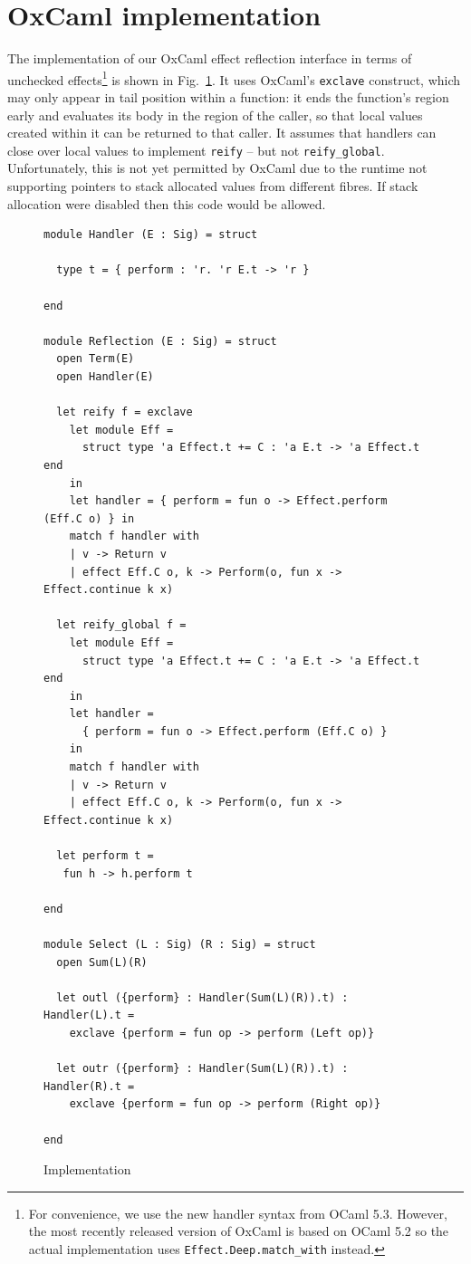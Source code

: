 \documentclass[acmsmall, screen, review, anonymous]{acmart}
\theoremstyle{definition}
\begin{document}
\section{OxCaml implementation}
\label{apdx:implementation}
The implementation of our OxCaml effect reflection interface in terms of
unchecked effects\footnote{For convenience, we use the new handler
  syntax from OCaml 5.3. However, the most recently released version of
  OxCaml is based on OCaml 5.2 so the actual implementation uses
  \lstinline[style=oxcaml]{Effect.Deep.match_with} instead.} is shown in
Fig.~\ref{fig:implementation}. It uses OxCaml's
\lstinline[style=oxcaml]{exclave} construct, which may only appear in
tail position within a function: it ends the function's region early
and evaluates its body in the region of the caller, so that local values
created within it can be returned to that caller. It assumes that
handlers can close over local values to implement
\lstinline[style=oxcaml]{reify} -- but not
\lstinline[style=oxcaml]{reify_global}. Unfortunately, this is not yet
permitted by OxCaml due to the runtime not supporting pointers to stack
allocated values from different fibres. If stack allocation were
disabled then this code would be allowed.
\begin{figure}
\begin{lstlisting}[style=oxcaml]
module Handler (E : Sig) = struct

  type t = { perform : 'r. 'r E.t -> 'r }

end

module Reflection (E : Sig) = struct
  open Term(E)
  open Handler(E)

  let reify f = exclave
    let module Eff =
      struct type 'a Effect.t += C : 'a E.t -> 'a Effect.t end
    in
    let handler = { perform = fun o -> Effect.perform (Eff.C o) } in
    match f handler with
    | v -> Return v
    | effect Eff.C o, k -> Perform(o, fun x -> Effect.continue k x)

  let reify_global f =
    let module Eff =
      struct type 'a Effect.t += C : 'a E.t -> 'a Effect.t end
    in
    let handler =
      { perform = fun o -> Effect.perform (Eff.C o) }
    in
    match f handler with
    | v -> Return v
    | effect Eff.C o, k -> Perform(o, fun x -> Effect.continue k x)

  let perform t =
   fun h -> h.perform t

end

module Select (L : Sig) (R : Sig) = struct
  open Sum(L)(R)

  let outl ({perform} : Handler(Sum(L)(R)).t) : Handler(L).t =
    exclave {perform = fun op -> perform (Left op)}

  let outr ({perform} : Handler(Sum(L)(R)).t) : Handler(R).t =
    exclave {perform = fun op -> perform (Right op)}

end
\end{lstlisting}
\caption{Implementation}
\label{fig:implementation}
\end{figure}
\end{document}
